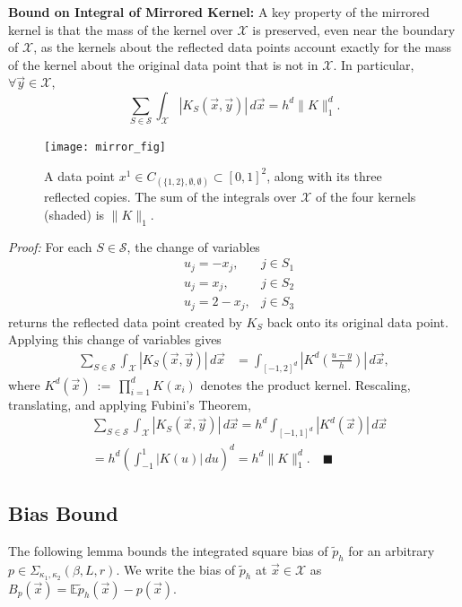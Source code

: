\documentclass{article}
\renewcommand{\qed}{\quad \ensuremath{\blacksquare}}    %
\newcommand{\Se}{\mathcal{S}}                       %
\newcommand{\X}{\mathcal{X}}                        %
\newcommand{\E}{\mathbb{E}}                         %
\newcommand{\pest}{\widetilde{p}_h}                 %
\newcommand{\vx}{\vec{x}}                           %
\newcommand{\vy}{\vec{y}}                           %
\begin{document}
{\bf Bound on Integral of Mirrored Kernel:}
A key property of the mirrored kernel is that the mass of the kernel over $\X$
is preserved, even near the boundary of $\X$, as the kernels about the
reflected data points account exactly for the mass of the kernel about the
original data point that is not in $\X$. In particular, $\forall \vy \in \X$,
\begin{equation}
\label{eq:mkmass}
\sum_{S \in \Se} \int_\X |K_S(\vx,\vy)| \, d\vx = h^d\|K\|_1^d.
\end{equation}
\begin{figure}[h!]
\begin{center}
\texttt{[image: mirror\_fig]}
\end{center}
\vspace{-3mm}
\caption{A data point
$x^1 \in C_{(\{1,2\},\emptyset,\emptyset)} \subset [0,1]^2$, along with its
three reflected copies. The sum of the integrals over $\X$ of the four kernels
(shaded) is $\|K\|_1$.}
\label{fig:mirror}
\end{figure}
\emph{Proof:}
For each $S \in \Se$, the change of variables
\begin{align*}
& u_j = -x_j,     & j \in S_1 \\
& u_j =  x_j,     & j \in S_2 \\
& u_j = 2 - x_j,  & j \in S_3
\end{align*}
returns the reflected data point created by $K_S$ back onto its original data
point. Applying this change of variables gives
\begin{align*}
 \sum_{S \in \Se} \int_\X |K_S(\vx,\vy)| \, d\vx
 &  = \int_{[-1,2]^d} \left|K^d\left(\frac{u - y}{h}\right)\right| \, d\vx,
\end{align*}
where $\displaystyle K^d(\vx)~:=~\prod_{i = 1}^d K(x_i)$ denotes the product
kernel. Rescaling, translating, and applying Fubini's Theorem,
\begin{align*}
 &  \sum_{S \in \Se} \int_\X |K_S(\vx,\vy)| \, d\vx
    = h^d\int_{[-1,1]^d} |K^d(\vx)| \, d\vx         \\
 &  = h^d\left( \int_{-1}^1 |K(u)| \, du \right)^d
    = h^d\|K\|_1^d. \qed
\end{align*}

\subsection{Bias Bound}
The following lemma bounds the integrated square bias of $\pest$ for an
arbitrary $p \in \Sigma_{\kappa_1,\kappa_2}(\beta,L,r)$. We write the bias of
$\pest$ at $\vx \in \X$ as $B_p(\vx) = \E\pest(\vx) - p(\vx)$.
\end{document}
